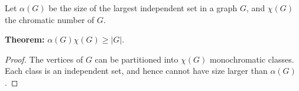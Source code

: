 \documentclass[12pt]{article}
\begin{document}
Let $\alpha(G)$ be the size of the largest independent set in a graph $G$, and $\chi(G)$ the chromatic number of $G$.

{\bf Theorem:} $\alpha(G)\chi(G) \geq |G|$.

\bigskip

\begin{proof}
The vertices of $G$ can be partitioned into $\chi(G)$ monochromatic classes. Each class is an independent set, and hence cannot have size larger than $\alpha(G)$.
\end{proof}
\end{document}
